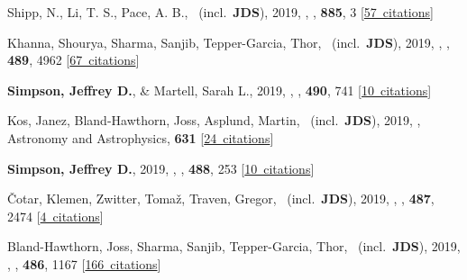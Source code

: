 \item[{\color{numcolor}\scriptsize33}] Shipp, N., Li, T. S., Pace, A. B., \etal\ (incl.\ \textbf{JDS}), 2019, , \apj, \textbf{885}, 3 [\href{https://ui.adsabs.harvard.edu/#abs/2019ApJ...885....3S}{57~citations}]

\item[{\color{numcolor}\scriptsize32}] Khanna, Shourya, Sharma, Sanjib, Tepper-Garcia, Thor, \etal\ (incl.\ \textbf{JDS}), 2019, , \mnras, \textbf{489}, 4962 [\href{https://ui.adsabs.harvard.edu/#abs/2019MNRAS.489.4962K}{67~citations}]

\item[{\color{numcolor}\scriptsize31}] \textbf{Simpson, Jeffrey D.}, \& Martell, Sarah L., 2019, , \mnras, \textbf{490}, 741 [\href{https://ui.adsabs.harvard.edu/#abs/2019MNRAS.490..741S}{10~citations}]

\item[{\color{numcolor}\scriptsize30}] Kos, Janez, Bland-Hawthorn, Joss, Asplund, Martin, \etal\ (incl.\ \textbf{JDS}), 2019, , Astronomy and Astrophysics, \textbf{631} [\href{https://ui.adsabs.harvard.edu/#abs/2019A&A...631A.166K}{24~citations}]

\item[{\color{numcolor}\scriptsize29}] \textbf{Simpson, Jeffrey D.}, 2019, , \mnras, \textbf{488}, 253 [\href{https://ui.adsabs.harvard.edu/#abs/2019MNRAS.488..253S}{10~citations}]

\item[{\color{numcolor}\scriptsize28}] {\v{C}}otar, Klemen, Zwitter, Toma{\v{z}}, Traven, Gregor, \etal\ (incl.\ \textbf{JDS}), 2019, , \mnras, \textbf{487}, 2474 [\href{https://ui.adsabs.harvard.edu/#abs/2019MNRAS.487.2474C}{4~citations}]

\item[{\color{numcolor}\scriptsize27}] Bland-Hawthorn, Joss, Sharma, Sanjib, Tepper-Garcia, Thor, \etal\ (incl.\ \textbf{JDS}), 2019, , \mnras, \textbf{486}, 1167 [\href{https://ui.adsabs.harvard.edu/#abs/2019MNRAS.486.1167B}{166~citations}]

